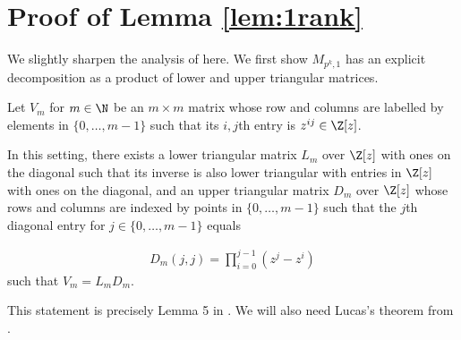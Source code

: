






\appendix
\section{Proof of Lemma \ref{lem:1rank}}\label{ap:rk}

We slightly sharpen the analysis of \cite{arsovski2021padic} here. We first show $M_{p^k,1}$ has an explicit decomposition as a product of lower and upper triangular matrices.

\begin{lem}\label{lem:diag}
Let $V_m$ for $m\in \N$ be an $m\times m$ matrix whose row and columns are labelled by elements in $\{0,\hdots,m-1\}$ such that its $i,j$th entry is $z^{ij}\in \Z[z]$. 

In this setting, there exists a lower triangular matrix $L_{m}$ over $\Z[z]$ with ones on the diagonal such that its inverse is also lower triangular with entries in $\Z[z]$ with ones on the diagonal, and an upper triangular matrix $D_{m}$ over $\Z[z]$ whose rows and columns are indexed by points in $\{0,\hdots,m-1\}$ such that the $j$th diagonal entry for $j\in \{0,\hdots,m-1\}$ equals

 \begin{align*}
 D_{m}(j,j)=      \prod_{i=0}^{j-1} (z^j-z^i)
 \end{align*}
 such that $V_{m}=L_{m}D_{m}$.
\end{lem}
This statement is precisely Lemma 5 in \cite{arsovski2021padic}. We will also need Lucas's theorem from \cite{Lucas}.





